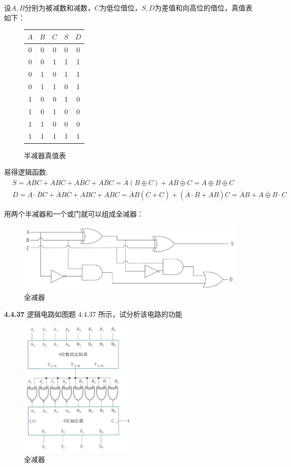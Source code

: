 \documentclass[a4paper,11pt,UTF8]{article}
\begin{document}
设$A,B$分别为被减数和减数，$C$为低位借位，$S,D$为差值和向高位的借位，真值表如下：
\begin{figure}[H]
	\centering
	\begin{tabular}{ccc|cc}
		\hline
		$A$ & $B$ & $C$ & $S$ & $D$\\
		\hline
		0 & 0 & 0 & 0 & 0\\
		0 & 0 & 1 & 1 & 1\\
		0 & 1 & 0 & 1 & 1\\
		0 & 1 & 1 & 0 & 1\\
		1 & 0 & 0 & 1 & 0\\
		1 & 0 & 1 & 0 & 0\\
		1 & 1 & 0 & 0 & 0\\
		1 & 1 & 1 & 1 & 1\\
		\hline
	\end{tabular}
	\caption{半减器真值表}
\end{figure}
易得逻辑函数:
\begin{align*}
	&S=\overline{A}\overline{B}C+\overline{A}B\overline{C}+A\overline{B}\overline{C}+ABC=\overline{A}(B\oplus C)+A\overline{B\oplus C}=A\oplus B\oplus C \\
	&D=\overline{A}\cdot\overline{B}C+\overline{A}B\overline{C}+\overline{A}BC+ABC=\overline{A}B(\overline{C}+C)+(\overline{A}\cdot\overline{B}+AB)C=\overline{A}B+\overline{A\oplus B}\cdot C
\end{align*}

用两个半减器和一个或门就可以组成全减器：
\begin{figure}[H]
	\centering
	\includegraphics[width=1\textwidth]{4.4.35_2}
	\caption{全减器}
\end{figure}
\textbf{4.4.37} 逻辑电路如图题 4.4.37 所示，试分析该电路的功能
\begin{figure}[H]
	\centering
	\includegraphics[width=0.5\textwidth]{4.4.37}
	\caption{全减器}
\end{figure}
\end{document}
